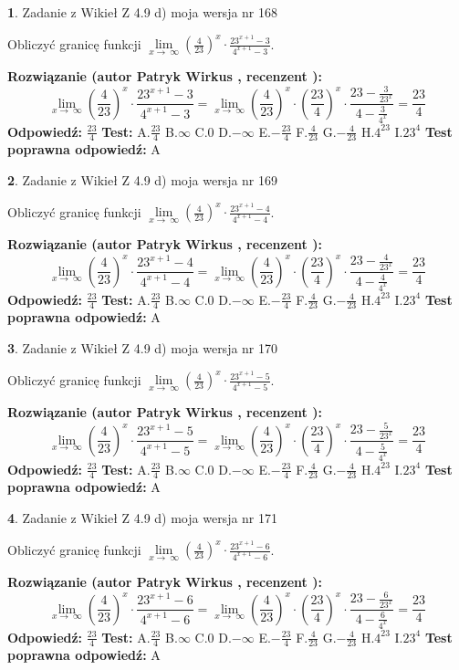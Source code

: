 \documentclass[12pt, a4paper]{article}
\theoremstyle{definition} %
\newtheorem{zad}{}
\newcommand{\zadStart}[1]{\begin{zad}#1\newline}
\newcommand{\zadStop}{\end{zad}}
\newcommand{\rozwStart}[2]{\noindent \textbf{Rozwiązanie (autor #1 , recenzent #2): }\newline}
\newcommand{\rozwStop}{\newline}
\newcommand{\odpStart}{\noindent \textbf{Odpowiedź:}\newline}
\newcommand{\odpStop}{\newline}
\newcommand{\testStart}{\noindent \textbf{Test:}\newline}
\newcommand{\testStop}{\newline}
\newcommand{\kluczStart}{\noindent \textbf{Test poprawna odpowiedź:}\newline}
\newcommand{\kluczStop}{\newline}
\begin{document}
\zadStart{Zadanie z Wikieł Z 4.9 d) moja wersja nr 168}


Obliczyć granicę funkcji  $\lim\limits_{x\to\ \infty}(\frac{4}{23})^{x}\cdot\frac{23^{x+1}-3}{4^{x+1}-3}$.
\zadStop
\rozwStart{Patryk Wirkus}{}
$$\lim\limits_{x\to\ \infty}(\frac{4}{23})^{x}\cdot\frac{23^{x+1}-3}{4^{x+1}-3}=\lim\limits_{x\to\ \infty}(\frac{4}{23})^{x}\cdot(\frac{23}{4})^{x} \cdot \frac{23-\frac{3}{23^{x}}}{4-\frac{3}{4^{x}}} = \frac{23}{4}$$
\rozwStop
\odpStart
$\frac{23}{4}$
\odpStop
\testStart
A.$\frac{23}{4}$ B.$\infty$ C.$0$ D.$-\infty$ E.$-\frac{23}{4}$
F.$\frac{4}{23}$ G.$-\frac{4}{23}$
H.$4^{23}$
I.$23^{4}$
\testStop
\kluczStart
A
\kluczStop



\zadStart{Zadanie z Wikieł Z 4.9 d) moja wersja nr 169}


Obliczyć granicę funkcji  $\lim\limits_{x\to\ \infty}(\frac{4}{23})^{x}\cdot\frac{23^{x+1}-4}{4^{x+1}-4}$.
\zadStop
\rozwStart{Patryk Wirkus}{}
$$\lim\limits_{x\to\ \infty}(\frac{4}{23})^{x}\cdot\frac{23^{x+1}-4}{4^{x+1}-4}=\lim\limits_{x\to\ \infty}(\frac{4}{23})^{x}\cdot(\frac{23}{4})^{x} \cdot \frac{23-\frac{4}{23^{x}}}{4-\frac{4}{4^{x}}} = \frac{23}{4}$$
\rozwStop
\odpStart
$\frac{23}{4}$
\odpStop
\testStart
A.$\frac{23}{4}$ B.$\infty$ C.$0$ D.$-\infty$ E.$-\frac{23}{4}$
F.$\frac{4}{23}$ G.$-\frac{4}{23}$
H.$4^{23}$
I.$23^{4}$
\testStop
\kluczStart
A
\kluczStop



\zadStart{Zadanie z Wikieł Z 4.9 d) moja wersja nr 170}


Obliczyć granicę funkcji  $\lim\limits_{x\to\ \infty}(\frac{4}{23})^{x}\cdot\frac{23^{x+1}-5}{4^{x+1}-5}$.
\zadStop
\rozwStart{Patryk Wirkus}{}
$$\lim\limits_{x\to\ \infty}(\frac{4}{23})^{x}\cdot\frac{23^{x+1}-5}{4^{x+1}-5}=\lim\limits_{x\to\ \infty}(\frac{4}{23})^{x}\cdot(\frac{23}{4})^{x} \cdot \frac{23-\frac{5}{23^{x}}}{4-\frac{5}{4^{x}}} = \frac{23}{4}$$
\rozwStop
\odpStart
$\frac{23}{4}$
\odpStop
\testStart
A.$\frac{23}{4}$ B.$\infty$ C.$0$ D.$-\infty$ E.$-\frac{23}{4}$
F.$\frac{4}{23}$ G.$-\frac{4}{23}$
H.$4^{23}$
I.$23^{4}$
\testStop
\kluczStart
A
\kluczStop



\zadStart{Zadanie z Wikieł Z 4.9 d) moja wersja nr 171}


Obliczyć granicę funkcji  $\lim\limits_{x\to\ \infty}(\frac{4}{23})^{x}\cdot\frac{23^{x+1}-6}{4^{x+1}-6}$.
\zadStop
\rozwStart{Patryk Wirkus}{}
$$\lim\limits_{x\to\ \infty}(\frac{4}{23})^{x}\cdot\frac{23^{x+1}-6}{4^{x+1}-6}=\lim\limits_{x\to\ \infty}(\frac{4}{23})^{x}\cdot(\frac{23}{4})^{x} \cdot \frac{23-\frac{6}{23^{x}}}{4-\frac{6}{4^{x}}} = \frac{23}{4}$$
\rozwStop
\odpStart
$\frac{23}{4}$
\odpStop
\testStart
A.$\frac{23}{4}$ B.$\infty$ C.$0$ D.$-\infty$ E.$-\frac{23}{4}$
F.$\frac{4}{23}$ G.$-\frac{4}{23}$
H.$4^{23}$
I.$23^{4}$
\testStop
\kluczStart
A
\kluczStop
\end{document}
